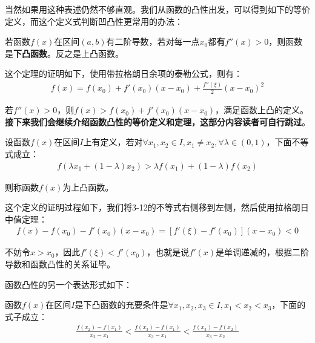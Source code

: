 \documentclass{ctexart}
\let\oldtextbf\textbf %
\renewcommand{\textbf}[1]{\textcolor{btex}{\oldtextbf{#1}}} %
\begin{document}
当然如果用这种表述仍然不够直观。我们从函数的凸性出发，可以得到如下的等价定义，而这个定义式判断凹凸性更常用的办法：
\begin{tcolorbox}[
    colback=bac1,     %
    colframe=fra1,   %
    coltitle=white,             %
    coltext=tex1,
    title=二阶导数和函数凹凸性,
    fonttitle=\bfseries,        %
arc=3mm,                     %
breakable
]
若函数$f(x)$在区间$(a,b)$有二阶导数，若对每一点$x_0$都\textbf{有$f''(x)>0$}，则函数是\textbf{下凸函数}。反之是上凸函数。
\end{tcolorbox}

这个定理的证明如下，使用带拉格朗日余项的泰勒公式，则有：
\begin{align*}
    f(x)=f(x_0)+f'(x_0)(x-x_0)+\frac{f''(\xi)}{2}(x-x_0)^2
\end{align*}

若$f''(x)>0$，则$f(x)>f(x_0)+f'(x_0)(x-x_0)$，满足函数上凸的定义。\textbf{接下来我们会继续介绍函数凸性的等价定义和定理，这部分内容读者可自行跳过}。

\begin{tcolorbox}[
    colback=bac2,     %
    colframe=fra2,   %
    coltitle=white,             %
    coltext=tex2,
    title=函数凸性的等价定义,
    fonttitle=\bfseries,        %
arc=3mm,                     %
breakable
]
设函数$f(x)$在区间$I$上有定义，若对$\forall x_1,x_2\in I,x_1\neq x_2,\forall \lambda \in (0,1)$，下面不等式成立：
\begin{align}
    f(\lambda x_1+(1-\lambda)x_2)>\lambda f(x_1)+(1-\lambda)f(x_2)\tag{3-13}
\end{align}

则称函数$f(x)$为上凸函数。
\end{tcolorbox}

这个定义的证明过程如下，我们将3-12的不等式右侧移到左侧，然后使用拉格朗日中值定理：
\begin{align*}
    f(x)-f(x_0)-f'(x_0)(x-x_0)=[f'(\xi)-f'(x_0)](x-x_0)<0
\end{align*}

不妨令$x>x_0$，因此$f'(\xi)<f'(x_0)$，也就是说$f'(x)$是单调递减的，根据二阶导数和函数凸性的关系证毕。

函数凸性的另一个表达形式如下：
\begin{tcolorbox}[
    colback=bac1,     %
    colframe=fra1,   %
    coltitle=white,             %
    coltext=tex1,
    title=函数凸性定理,
    fonttitle=\bfseries,        %
arc=3mm,                     %
breakable
]
函数$f(x)$在区间$I$是下凸函数的充要条件是$\forall x_1,x_2,x_3\in I,x_1<x_2<x_3$，下面的式子成立：
\begin{align*}
    \frac{f(x_2)-f(x_1)}{x_2-x_1}<\frac{f(x_3)-f(x_1)}{x_3-x_1}<\frac{f(x_3)-f(x_2)}{x_3-x_2}\tag{3-14}
\end{align*}
\end{tcolorbox}
\end{document}
